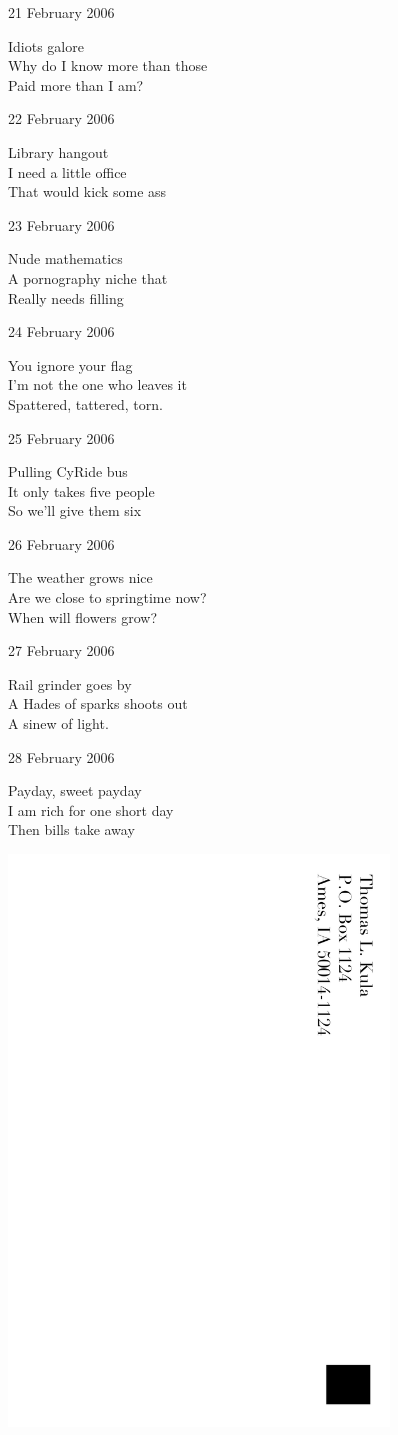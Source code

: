 \documentclass[12pt]{article}
\begin{document}
21 February 2006

Idiots galore \\
Why do I know more than those \\
Paid more than I am?

22 February 2006

Library hangout \\
I need a little office \\
That would kick some ass

23 February 2006

Nude mathematics \\
A pornography niche that \\
Really needs filling

24 February 2006

You ignore your flag \\
I'm not the one who leaves it \\
Spattered, tattered, torn.


\newpage

25 February 2006

Pulling CyRide bus \\
It only takes five people \\
So we'll give them six

26 February 2006

The weather grows nice \\
Are we close to springtime now? \\
When will flowers grow?

27 February 2006

Rail grinder goes by \\
A Hades of sparks shoots out \\
A sinew of light.

28 February 2006

Payday, sweet payday \\
I am rich for one short day \\
Then bills take away

\newpage

\includegraphics[width=101mm]{backpage.png}
\end{document}
